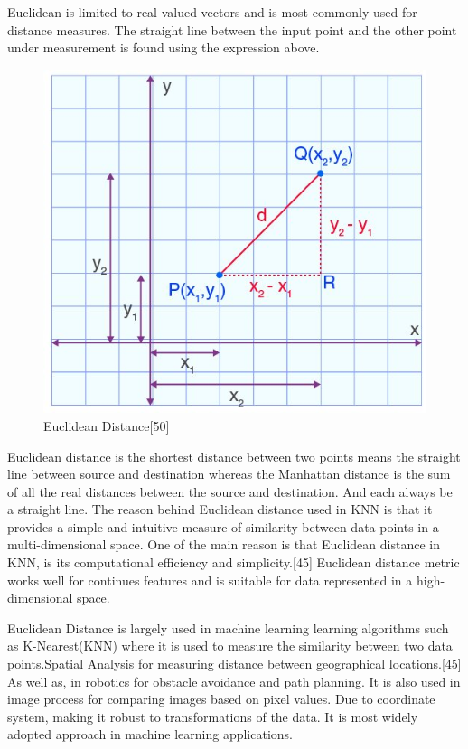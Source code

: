 \documentclass[conference]{IEEEtran}
\begin{document}
Euclidean is limited to real-valued vectors and is most commonly used for distance measures. The straight line between the input point and the other point under measurement is found using the expression above. 


\begin{figure}
    \centering
    \includegraphics[width=0.7\linewidth]{EDistance.jpg}
    \caption{Euclidean Distance[50]}
    \label{fig:enter-label}
\end{figure}


Euclidean distance is the shortest distance between two points means the straight line between source and destination whereas the Manhattan distance is the sum of all the real distances between the source and destination. And each always be a straight line. The reason behind Euclidean distance used in KNN is that it provides a simple and intuitive measure of similarity between data points in a multi-dimensional space. One of the main reason is that Euclidean distance in KNN, is its computational efficiency and simplicity.[45] Euclidean distance metric works well for continues features and is suitable for data represented in a high-dimensional space. 



Euclidean Distance is largely used in machine learning learning algorithms such as K-Nearest(KNN) where it is used to measure the similarity between two data points.Spatial Analysis for measuring distance between geographical locations.[45] As well as, in robotics for obstacle avoidance and path planning. It is also used in image process for comparing images based on pixel values. Due to coordinate system, making it robust to transformations of the data. It is most widely adopted approach in machine learning applications. 
\end{document}
